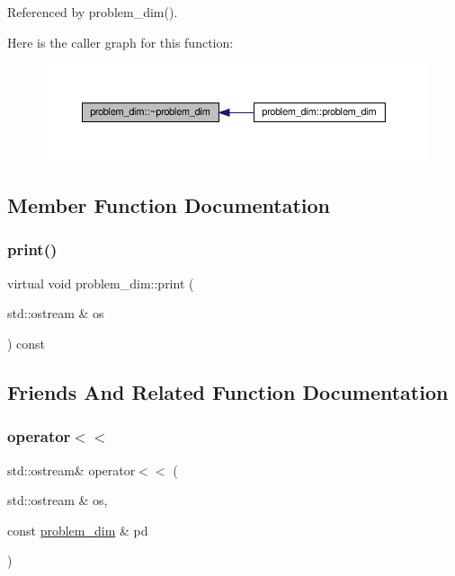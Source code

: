 Referenced by problem\+\_\+dim().

Here is the caller graph for this function\+:
\nopagebreak
\begin{figure}[H]
\begin{center}
\leavevmode
\includegraphics[width=350pt]{d6/d56/classproblem__dim_ae901efbb896887db42654cea94c2f72e_icgraph}
\end{center}
\end{figure}


\subsection{Member Function Documentation}
\mbox{\label{classproblem__dim_a12f1ffb3b227cfaea36e70ce42dd0834}} 
\subsubsection{\texorpdfstring{print()}{print()}}
{\footnotesize\ttfamily virtual void problem\+\_\+dim\+::print (\begin{DoxyParamCaption}\item[{std\+::ostream \&}]{os }\end{DoxyParamCaption}) const\hspace{0.3cm}{\ttfamily [pure virtual]}}



\subsection{Friends And Related Function Documentation}
\mbox{\label{classproblem__dim_a3cc1760b9078b611daa4df89663d2076}} 
\subsubsection{\texorpdfstring{operator$<$$<$}{operator<<}}
{\footnotesize\ttfamily std\+::ostream\& operator$<$$<$ (\begin{DoxyParamCaption}\item[{std\+::ostream \&}]{os,  }\item[{const \hyperlink{classproblem__dim}{problem\+\_\+dim} \&}]{pd }\end{DoxyParamCaption})\hspace{0.3cm}{\ttfamily [friend]}}



